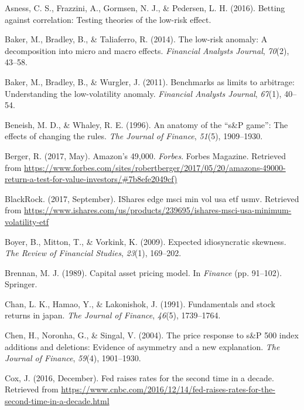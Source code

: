 \documentclass[12pt,twoside]{reedthesis}
\theoremstyle{definition}
\theoremstyle{definition}
\theoremstyle{definition}
\theoremstyle{remark}
\begin{document}
\hypertarget{ref-asness2016}{}
Asness, C. S., Frazzini, A., Gormsen, N. J., \& Pedersen, L. H. (2016).
Betting against correlation: Testing theories of the low-risk effect.

\hypertarget{ref-baker2014}{}
Baker, M., Bradley, B., \& Taliaferro, R. (2014). The low-risk anomaly:
A decomposition into micro and macro effects. \emph{Financial Analysts
Journal}, \emph{70}(2), 43--58.

\hypertarget{ref-baker2011}{}
Baker, M., Bradley, B., \& Wurgler, J. (2011). Benchmarks as limits to
arbitrage: Understanding the low-volatility anomaly. \emph{Financial
Analysts Journal}, \emph{67}(1), 40--54.

\hypertarget{ref-beneish1996}{}
Beneish, M. D., \& Whaley, R. E. (1996). An anatomy of the ``s\&P
game'': The effects of changing the rules. \emph{The Journal of
Finance}, \emph{51}(5), 1909--1930.

\hypertarget{ref-berger2017}{}
Berger, R. (2017, May). Amazon's 49,000. \emph{Forbes}. Forbes Magazine.
Retrieved from
\url{https://www.forbes.com/sites/robertberger/2017/05/20/amazons-49000-return-a-test-for-value-investors/\#7b8efe2049cf)}

\hypertarget{ref-blackrock2017}{}
BlackRock. (2017, September). IShares edge msci min vol usa etf
\textbar{} usmv. Retrieved from
\url{https://www.ishares.com/us/products/239695/ishares-msci-usa-minimum-volatility-etf}

\hypertarget{ref-boyer2009}{}
Boyer, B., Mitton, T., \& Vorkink, K. (2009). Expected idiosyncratic
skewness. \emph{The Review of Financial Studies}, \emph{23}(1),
169--202.

\hypertarget{ref-brennan1989}{}
Brennan, M. J. (1989). Capital asset pricing model. In \emph{Finance}
(pp. 91--102). Springer.

\hypertarget{ref-chan1991}{}
Chan, L. K., Hamao, Y., \& Lakonishok, J. (1991). Fundamentals and stock
returns in japan. \emph{The Journal of Finance}, \emph{46}(5),
1739--1764.

\hypertarget{ref-chen2004}{}
Chen, H., Noronha, G., \& Singal, V. (2004). The price response to s\&P
500 index additions and deletions: Evidence of asymmetry and a new
explanation. \emph{The Journal of Finance}, \emph{59}(4), 1901--1930.

\hypertarget{ref-cox2016}{}
Cox, J. (2016, December). Fed raises rates for the second time in a
decade. Retrieved from
\url{https://www.cnbc.com/2016/12/14/fed-raises-rates-for-the-second-time-in-a-decade.html}
\end{document}

